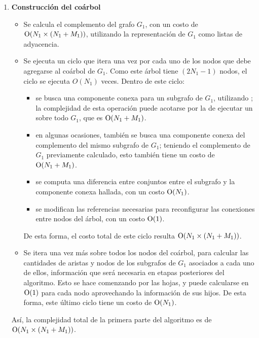\begin{enumerate}[label=(\roman*)]

\item \textbf{Construcción del coárbol}

\begin{itemize}
    \item Se calcula el complemento del grafo $G_1$, con un costo de
    $\operatorname{O}(N_1 \times (N_1 + M_1))$, utilizando la representación de $G_1$
    como listas de adyacencia.
    \item Se ejecuta un ciclo que itera una vez por cada uno de los nodos que
    debe agregarse al coárbol de $G_1$. Como este árbol tiene $(2 N_1 - 1)$
    nodos, el ciclo se ejecuta $O(N_1)$ veces. Dentro de este ciclo:
    \begin{itemize}
        \item se busca una componente conexa para un subgrafo de $G_1$,
        utilizando ; la complejidad de esta operación puede acotarse
        por la de ejecutar un  sobre todo $G_1$, que es
        $\operatorname{O}(N_1 + M_1)$.
        \item en algunas ocasiones, también se busca una componente conexa
        del complemento del mismo subgrafo de $G_1$; teniendo el complemento
        de $G_1$ previamente calculado, esto también tiene un costo de
        $\operatorname{O}(N_1 + M_1)$.
        \item se computa una diferencia entre conjuntos entre el subgrafo y la
        componente conexa hallada, con un costo $\operatorname{O}(N_1)$.
        \item se modifican las referencias necesarias para reconfigurar las
        conexiones entre nodos del árbol, con un costo $\operatorname{O}(1)$.
    \end{itemize}
    De esta forma, el costo total de este ciclo resulta $\operatorname{O}(N_1 \times
    (N_1 + M_1))$.
    \item Se itera una vez más sobre todos los nodos del coárbol, para calcular
    las cantidades de aristas y nodos de los subgrafos de $G_1$ asociados a
    cada uno de ellos, información que será necesaria en etapas posteriores
    del algoritmo. Esto se hace comenzando por las hojas, y puede calcularse
    en $\operatorname{O}(1)$ para cada nodo aprovechando la información de sus hijos. De
    esta forma, este último ciclo tiene un costo de $\operatorname{O}(N_1)$.
\end{itemize}

Así, la complejidad total de la primera parte del algoritmo es de $\operatorname{O}(N_1
\times (N_1 + M_1))$.


\end{enumerate}
